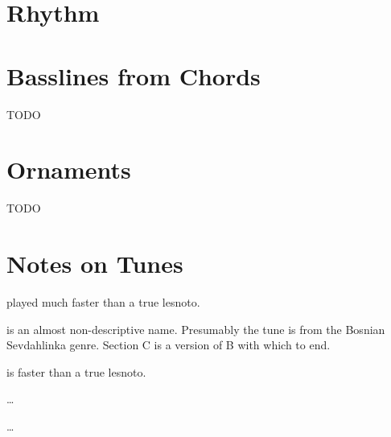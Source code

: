 
\section{Rhythm}
\begin{center}
\end{center}

\section{Basslines from Chords}
TODO

\section{Ornaments}
TODO

\section{Notes on Tunes}
\begin{description}[noitemsep]
\item[Ratevka] played much faster than a true lesnoto.
\item[Sevda] is an almost non-descriptive name.
	Presumably the tune is from the Bosnian Sevdahlinka
	genre.
	Section C is a version of B with which to end.
\item[Četvorno Šopsko Horo] is faster than a true lesnoto.
\item[TODO] \dots
\item[TODO] \dots
\end{description}


